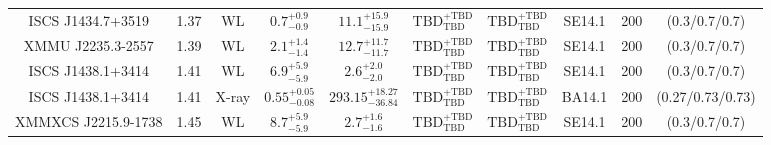 \begin{table}
\begin{tabular}{cccccccccc}
ISCS J1434.7+3519 & 1.37 & WL & ${0.7}^{+0.9}_{-0.9}$ & ${11.1}^{+15.9}_{-15.9}$ & ${\mathrm{TBD}}^{+\mathrm{TBD}}_{\mathrm{TBD}}$ & ${\mathrm{TBD}}^{+\mathrm{TBD}}_{\mathrm{TBD}}$ & SE14.1 & 200 & (0.3/0.7/0.7) \\
XMMU J2235.3-2557 & 1.39 & WL & ${2.1}^{+1.4}_{-1.4}$ & ${12.7}^{+11.7}_{-11.7}$ & ${\mathrm{TBD}}^{+\mathrm{TBD}}_{\mathrm{TBD}}$ & ${\mathrm{TBD}}^{+\mathrm{TBD}}_{\mathrm{TBD}}$ & SE14.1 & 200 & (0.3/0.7/0.7) \\
ISCS J1438.1+3414 & 1.41 & WL & ${6.9}^{+5.9}_{-5.9}$ & ${2.6}^{+2.0}_{-2.0}$ & ${\mathrm{TBD}}^{+\mathrm{TBD}}_{\mathrm{TBD}}$ & ${\mathrm{TBD}}^{+\mathrm{TBD}}_{\mathrm{TBD}}$ & SE14.1 & 200 & (0.3/0.7/0.7) \\
ISCS J1438.1+3414 & 1.41 & X-ray & ${0.55}^{+0.05}_{-0.08}$ & ${293.15}^{+18.27}_{-36.84}$ & ${\mathrm{TBD}}^{+\mathrm{TBD}}_{\mathrm{TBD}}$ & ${\mathrm{TBD}}^{+\mathrm{TBD}}_{\mathrm{TBD}}$ & BA14.1 & 200 & (0.27/0.73/0.73) \\
XMMXCS J2215.9-1738 & 1.45 & WL & ${8.7}^{+5.9}_{-5.9}$ & ${2.7}^{+1.6}_{-1.6}$ & ${\mathrm{TBD}}^{+\mathrm{TBD}}_{\mathrm{TBD}}$ & ${\mathrm{TBD}}^{+\mathrm{TBD}}_{\mathrm{TBD}}$ & SE14.1 & 200 & (0.3/0.7/0.7) \\
\end{tabular}
\end{table}
